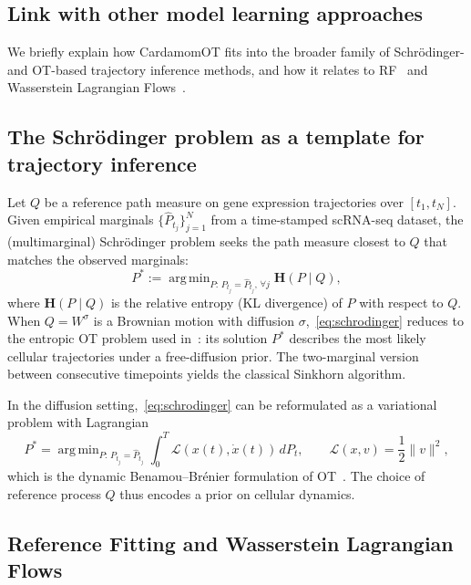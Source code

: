 \documentclass[a4paper, 11pt]{article}
\DeclareMathOperator*{\argmin}{arg\,min}
\theoremstyle{plain}
\theoremstyle{remark}
\newcommand*{\firstreview}[1]{{\color{black}#1}}
\begin{document}
\begin{appendices}

\section{Link with other model learning approaches}
\label{supp_OT}

We briefly explain how CardamomOT fits into the broader family of Schrödinger- and OT-based trajectory inference methods, and how it relates to \firstreview{RF}~\cite{zhang2024joint} and Wasserstein Lagrangian Flows~\cite{neklyudov2023computational}.

\subsection{The Schrödinger problem as a template for trajectory inference}

Let $Q$ be a reference path measure on gene expression trajectories over $[t_1, t_N]$. Given empirical marginals $\{\hat{P}_{t_j}\}_{j=1}^N$ from a time-stamped scRNA-seq dataset, the (multimarginal) Schrödinger problem seeks the path measure closest to $Q$ that matches the observed marginals:
\begin{equation}
\label{eq:schrodinger}
P^* := \argmin_{P :\, P_{t_j} = \hat{P}_{t_j},\, \forall j}
\mathbf{H}(P \mid Q),
\end{equation}
where $\mathbf{H}(P\mid Q)$ is the relative entropy (KL divergence) of $P$ with respect to $Q$. When $Q = W^\sigma$ is a Brownian motion with diffusion $\sigma$,~\eqref{eq:schrodinger} reduces to the entropic OT problem used in~\cite{schiebinger2019optimal}: its solution $P^*$ describes the most likely cellular trajectories under a free-diffusion prior. The two-marginal version between consecutive timepoints yields the classical Sinkhorn algorithm.

In the diffusion setting,~\eqref{eq:schrodinger} can be reformulated as a variational problem with Lagrangian
\begin{equation}
\label{eq:Benamou}
P^* = \argmin_{P:\, P_{t_j} = \hat{P}_{t_j}}
\int_0^T \mathcal{L}(x(t), \dot{x}(t))\,dP_t,
\qquad
\mathcal{L}(x,v) = \frac{1}{2}\|v\|^2,
\end{equation}
which is the dynamic Benamou–Brénier formulation of OT~\cite{leonard2012schrodinger}. The choice of reference process $Q$ thus encodes a prior on cellular dynamics.

\subsection{Reference Fitting and Wasserstein Lagrangian Flows}


\end{appendices}
\end{document}
